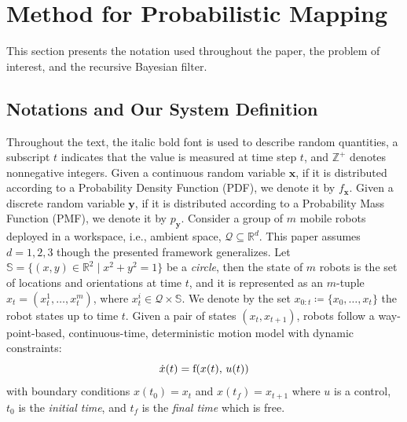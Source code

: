 \documentclass[letterpaper, 10 pt, conference]{ieeeconf}
\begin{document}
\section{Method for Probabilistic Mapping}
\label{sec:sec2}

This section presents the notation used throughout the paper, the problem of interest, and the recursive Bayesian filter.

\subsection{Notations and Our System Definition}
Throughout the text, the italic bold font is used to describe random quantities, a subscript $t$ indicates that the value is measured at time step $t$, and $\mathbb{Z}^{+}$ denotes nonnegative integers. 
Given a continuous random variable $\bm{x}$, if it is distributed according to a Probability Density Function (PDF), we denote it by $f_{\bm{x}}$.
Given a discrete random variable $\bm{y}$, if it is distributed according to a Probability Mass Function (PMF), we denote it by $p_{\bm{y}}$.
Consider a group of $m$ mobile robots deployed in a workspace, i.e., ambient space, $\mathcal{Q} \subseteq \mathbb{R}^d$. 
This paper assumes $d=1,2,3$ though the presented framework generalizes. 
Let $\mathbb{S} = \lbrace (x,y)\in \mathbb{R}^2\mid x^2+y^2=1 \rbrace$ be a \emph{circle}, then the state of $m$ robots is the set of locations and orientations at time $t$, and it is represented as an $m$-tuple $x_t = (x_t^1,\dots,x_t^m)$, where $x_t^i \in \mathcal{Q} \times \mathbb{S}$. We denote by the set ${x}_{0:t}\coloneqq \lbrace {x}_0,\dots,{x}_t \rbrace$ the robot states up to time $t$. 
Given a pair of states $(x_t,x_{t+1})$, robots follow a way-point-based, continuous-time, deterministic motion model with dynamic constraints:
\begin{equation}
\dot{x}(t) = \textup{f}(x(t),\,u(t))
\label{eq:constraint}
\end{equation}
with boundary conditions $x(t_0) = x_t$ and $x(t_f) = x_{t+1}$ where $u$ is a control, $t_0$ is the \emph{initial time}, and $t_f$ is the \emph{final time} which is free. 
\end{document}
